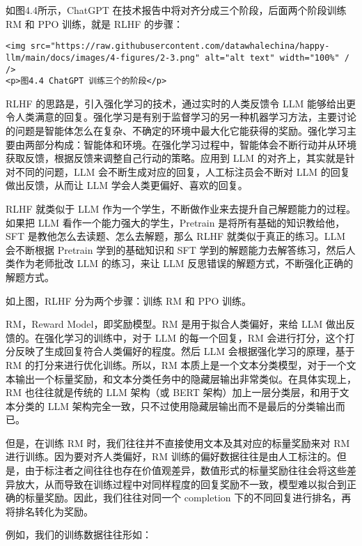 \documentclass[
]{article}
\begin{document}
如图4.4所示，ChatGPT 在技术报告中将对齐分成三个阶段，后面两个阶段训练 RM
和 PPO 训练，就是 RLHF 的步骤：

\begin{verbatim}
<img src="https://raw.githubusercontent.com/datawhalechina/happy-llm/main/docs/images/4-figures/2-3.png" alt="alt text" width="100%" / />
<p>图4.4 ChatGPT 训练三个的阶段</p>
\end{verbatim}

RLHF 的思路是，引入强化学习的技术，通过实时的人类反馈令 LLM
能够给出更令人类满意的回复。强化学习是有别于监督学习的另一种机器学习方法，主要讨论的问题是智能体怎么在复杂、不确定的环境中最大化它能获得的奖励。强化学习主要由两部分构成：智能体和环境。在强化学习过程中，智能体会不断行动并从环境获取反馈，根据反馈来调整自己行动的策略。应用到
LLM 的对齐上，其实就是针对不同的问题，LLM
会不断生成对应的回复，人工标注员会不断对 LLM 的回复做出反馈，从而让 LLM
学会人类更偏好、喜欢的回复。

RLHF 就类似于 LLM
作为一个学生，不断做作业来去提升自己解题能力的过程。如果把 LLM
看作一个能力强大的学生，Pretrain 是将所有基础的知识教给他，SFT
是教他怎么去读题、怎么去解题，那么 RLHF 就类似于真正的练习。LLM
会不断根据 Pretrain 学到的基础知识和 SFT
学到的解题能力去解答练习，然后人类作为老师批改 LLM 的练习，来让 LLM
反思错误的解题方式，不断强化正确的解题方式。

如上图，RLHF 分为两个步骤：训练 RM 和 PPO 训练。

RM，Reward Model，即奖励模型。RM 是用于拟合人类偏好，来给 LLM
做出反馈的。在强化学习的训练中，对于 LLM 的每一个回复，RM
会进行打分，这个打分反映了生成回复符合人类偏好的程度。然后 LLM
会根据强化学习的原理，基于 RM 的打分来进行优化训练。所以，RM
本质上是一个文本分类模型，对于一个文本输出一个标量奖励，和文本分类任务中的隐藏层输出非常类似。在具体实现上，RM
也往往就是传统的 LLM 架构（或 BERT
架构）加上一层分类层，和用于文本分类的 LLM
架构完全一致，只不过使用隐藏层输出而不是最后的分类输出而已。

但是，在训练 RM 时，我们往往并不直接使用文本及其对应的标量奖励来对 RM
进行训练。因为要对齐人类偏好，RM
训练的偏好数据往往是由人工标注的。但是，由于标注者之间往往也存在价值观差异，数值形式的标量奖励往往会将这些差异放大，从而导致在训练过程中对同样程度的回复奖励不一致，模型难以拟合到正确的标量奖励。因此，我们往往对同一个
completion 下的不同回复进行排名，再将排名转化为奖励。

例如，我们的训练数据往往形如：
\end{document}

